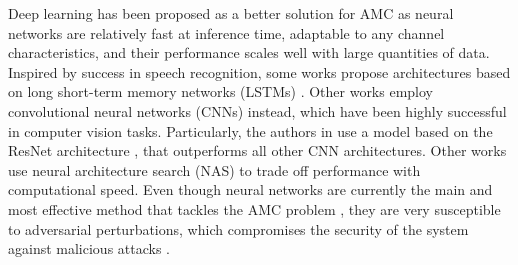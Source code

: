 \documentclass[conference]{IEEEtran}
\newcommand{\pf}[1]{{\textcolor{orange}{PF: {#1}}}}
\begin{document}
Deep learning \cite{goodfellow2016deep} has been proposed as a better solution for AMC as neural networks are relatively fast at inference time, adaptable to any channel characteristics, and their performance scales well with large quantities of data. Inspired by success in speech recognition, some works \cite{Rajendran_Meert_Giustiniano_Lenders_Pollin_2018,Guo_Jiang_Wu_Zhou_2020} propose architectures based on long short-term memory networks (LSTMs) \cite{Hochreiter_Schmidhuber_1997}. Other works \cite{OShea_Corgan_Clancy_2016,West_OShea_2017,Sadeghi_Larsson_2019} employ convolutional neural networks (CNNs) \cite{Krizhevsky_Sutskever_Hinton_2017} instead, which have been highly successful in computer vision tasks. Particularly, the authors in \cite{OShea_Roy_Clancy_2018} use a model based on the ResNet architecture \cite{Szegedy_Ioffe_Vanhoucke_Alemi_2016}, that outperforms all other CNN architectures. Other works use neural architecture search (NAS) \cite{ahmadi2008modulation,dai2019multi,perenda2021evolutionary} to trade off performance with computational speed. Even though neural networks are currently the main and most effective method that tackles the AMC problem \cite{OShea_Roy_Clancy_2018}, they are very susceptible to adversarial perturbations, which compromises the security of the system against malicious attacks  \cite{Szegedy_Zaremba_Sutskever_Bruna_Erhan_Goodfellow_Fergus_2014, moosavi2017universal,Sadeghi_Larsson_2019,Lin_Zhao_2020,Flowers_Buehrer_Headley_2019, maroto2021benefits}. 

\end{document}
